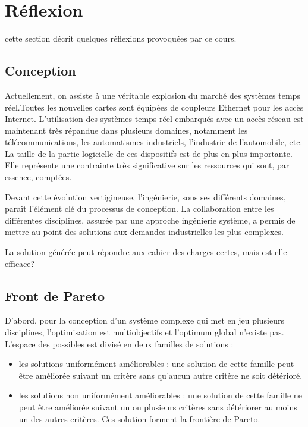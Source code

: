\documentclass[11pt]{article}
\begin{document}
\section{Réflexion}

cette section décrit quelques réflexions provoquées par ce cours.

\subsection{Conception}

Actuellement, on assiste à une véritable explosion du marché des systèmes temps réel.Toutes les nouvelles cartes sont équipées de coupleurs Ethernet pour les accès Internet. L'utilisation des systèmes temps réel embarqués avec un accès réseau est maintenant très répandue dans plusieurs domaines, notamment les télécommunications, les automatismes industriels, l'industrie de l’automobile, etc. La taille de la partie logicielle de ces dispositifs est de plus en plus importante. Elle représente une contrainte très significative sur les ressources qui sont, par essence, comptées.

Devant cette évolution vertigineuse, l'ingénierie, sous ses différents domaines, paraît l'élément clé du processus de conception. La collaboration entre les différentes disciplines, assurée par une approche ingénierie système, a permis de mettre au point des solutions aux demandes industrielles les plus complexes.

La solution générée peut répondre aux cahier des charges certes, mais est elle efficace?

\subsection{Front de Pareto}

D'abord, pour la conception d'un système complexe qui met en jeu plusieurs disciplines, l'optimisation est multiobjectifs et l'optimum global n'existe pas.
L'espace des possibles est divisé en deux familles de solutions :
\begin{itemize}
\item les solutions uniformément améliorables : une solution de cette famille peut être améliorée suivant un critère sans qu'aucun autre critère ne soit détérioré.
\item les solutions non uniformément améliorables : une solution de cette famille ne peut être améliorée suivant un ou plusieurs critères sans détériorer au moins un des autres critères. Ces solution forment la frontière de Pareto.
\end{itemize}
\end{document}
